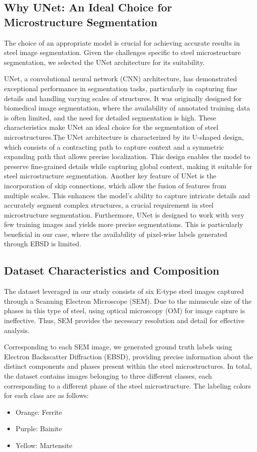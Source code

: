 \documentclass[]{article}
\begin{document}
\subsection{Why UNet: An Ideal Choice for Microstructure Segmentation}

The choice of an appropriate model is crucial for achieving accurate results in steel image segmentation. Given the challenges specific to steel microstructure segmentation, we selected the UNet architecture \cite{ronneberger2015unet} for its suitability.

UNet, a convolutional neural network (CNN) architecture, has demonstrated exceptional performance in segmentation tasks, particularly in capturing fine details and handling varying scales of structures. It was originally designed for biomedical image segmentation, where the availability of annotated training data is often limited, and the need for detailed segmentation is high. These characteristics make UNet an ideal choice for the segmentation of steel microstructures.The UNet architecture is characterized by its U-shaped design, which consists of a contracting path to capture context and a symmetric expanding path that allows precise localization. This design enables the model to preserve fine-grained details while capturing global context, making it suitable for steel microstructure segmentation. Another key feature of UNet is the incorporation of skip connections, which allow the fusion of features from multiple scales. This enhances the model's ability to capture intricate details and accurately segment complex structures, a crucial requirement in steel microstructure segmentation.
Furthermore, UNet is designed to work with very few training images and yields more precise segmentations. This is particularly beneficial in our case, where the availability of pixel-wise labels generated through EBSD is limited.

\subsection{Dataset Characteristics and Composition}

The dataset leveraged in our study consists of six E-type steel images captured through a Scanning Electron Microscope (SEM). Due to the minuscule size of the phases in this type of steel, using optical microscopy (OM) for image capture is ineffective. Thus, SEM provides the necessary resolution and detail for effective analysis.

Corresponding to each SEM image, we generated ground truth labels using Electron Backscatter Diffraction (EBSD), providing precise information about the distinct components and phases present within the steel microstructures. In total, the dataset contains images belonging to three different classes, each corresponding to a different phase of the steel microstructure. The labeling colors for each class are as follows:
\begin{itemize}
	\item Orange: Ferrite
	\item Purple: Bainite
	\item Yellow: Martensite
\end{itemize}
\end{document}
